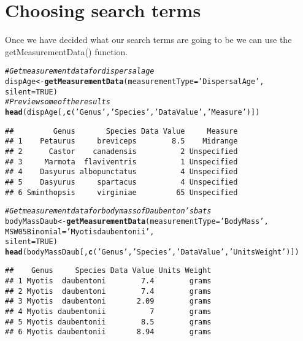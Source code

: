 \documentclass[a4paper]{article}\usepackage[]{graphicx}\usepackage[]{color}
\makeatletter
\newcommand{\hlnum}[1]{\textcolor[rgb]{0.686,0.059,0.569}{#1}}%
\newcommand{\hlstr}[1]{\textcolor[rgb]{0.192,0.494,0.8}{#1}}%
\newcommand{\hlcom}[1]{\textcolor[rgb]{0.678,0.584,0.686}{\textit{#1}}}%
\newcommand{\hlstd}[1]{\textcolor[rgb]{0.345,0.345,0.345}{#1}}%
\newcommand{\hlkwb}[1]{\textcolor[rgb]{0.69,0.353,0.396}{#1}}%
\newcommand{\hlkwc}[1]{\textcolor[rgb]{0.333,0.667,0.333}{#1}}%
\newcommand{\hlkwd}[1]{\textcolor[rgb]{0.737,0.353,0.396}{\textbf{#1}}}%
\newenvironment{kframe}{%
 \def\at@end@of@kframe{}%
 \ifinner\ifhmode%
  \def\at@end@of@kframe{\end{minipage}}%
  \begin{minipage}{\columnwidth}%
 \fi\fi%
 \def\FrameCommand##1{\hskip\@totalleftmargin \hskip-\fboxsep
 \colorbox{shadecolor}{##1}\hskip-\fboxsep
     \hskip-\linewidth \hskip-\@totalleftmargin \hskip\columnwidth}%
 \MakeFramed {\advance\hsize-\width
   \@totalleftmargin\z@ \linewidth\hsize
   \@setminipage}}%
 {\par\unskip\endMakeFramed%
 \at@end@of@kframe}
\newenvironment{knitrout}{}{} %
\makeatother
\begin{document}
\section{Choosing search terms}
Once we have decided what our search terms are going to be we can use the getMeasurementData() function.

\begin{knitrout}
\color{fgcolor}\begin{kframe}
\begin{alltt}
\hlcom{# Get measurement data for dispersal age}
\hlstd{dispAge} \hlkwb{<-} \hlkwd{getMeasurementData}\hlstd{(}\hlkwc{measurementType} \hlstd{=} \hlstr{'Dispersal Age'}\hlstd{,}
                              \hlkwc{silent} \hlstd{=} \hlnum{TRUE}\hlstd{)}
\hlcom{# Preview some of the results}
\hlkwd{head}\hlstd{(dispAge[,}\hlkwd{c}\hlstd{(}\hlstr{'Genus'}\hlstd{,}\hlstr{'Species'}\hlstd{,}\hlstr{'Data Value'}\hlstd{,}\hlstr{'Measure'}\hlstd{)])}
\end{alltt}
\begin{verbatim}
##         Genus       Species Data Value     Measure
## 1    Petaurus     breviceps        8.5    Midrange
## 2      Castor    canadensis          2 Unspecified
## 3     Marmota  flaviventris          1 Unspecified
## 4    Dasyurus albopunctatus          4 Unspecified
## 5    Dasyurus     spartacus          4 Unspecified
## 6 Sminthopsis     virginiae         65 Unspecified
\end{verbatim}
\begin{alltt}
\hlcom{# Get measurement data for body mass of Daubenton's bats}
\hlstd{bodyMassDaub} \hlkwb{<-} \hlkwd{getMeasurementData}\hlstd{(}\hlkwc{measurementType} \hlstd{=} \hlstr{'Body Mass'}\hlstd{,}
                                   \hlkwc{MSW05Binomial} \hlstd{=} \hlstr{'Myotis daubentonii'}\hlstd{,}
                                   \hlkwc{silent} \hlstd{=} \hlnum{TRUE}\hlstd{)}
\hlkwd{head}\hlstd{(bodyMassDaub[,}\hlkwd{c}\hlstd{(}\hlstr{'Genus'}\hlstd{,}\hlstr{'Species'}\hlstd{,}\hlstr{'Data Value'}\hlstd{,}\hlstr{'Units Weight'}\hlstd{)])}
\end{alltt}
\begin{verbatim}
##    Genus     Species Data Value Units Weight
## 1 Myotis  daubentoni        7.4        grams
## 2 Myotis  daubentoni        7.4        grams
## 3 Myotis  daubentoni       2.09        grams
## 4 Myotis daubentonii          7        grams
## 5 Myotis daubentonii        8.5        grams
## 6 Myotis daubentonii       8.94        grams

\end{verbatim}
\end{kframe}
\end{knitrout}
\end{document}
